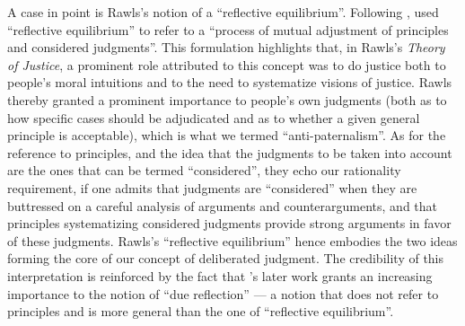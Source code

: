 \documentclass[version=3.21, pagesize, twoside=off, bibliography=totoc, DIV=calc, fontsize=12pt, a4paper, french, english]{scrartcl}
\begin{document}
A case in point is Rawls’s notion of a “reflective equilibrium”. 
Following \citet{goodman_fact_1983}, \citet[][p.18]{rawls_theory_1999} used “reflective equilibrium” to refer to a “process of mutual adjustment of principles and considered judgments”. 
This formulation highlights that, in Rawls's \emph{Theory of Justice}, a prominent role attributed to this concept was to do justice both to people's moral intuitions and to the need to systematize visions of justice. 
Rawls thereby granted a prominent importance to people's own judgments (both as to how specific cases should be adjudicated and as to whether a given general principle is acceptable), which is what we termed  “anti-paternalism”. 
As for the reference to principles, and the idea that the judgments to be taken into account are the ones that can be termed “considered”, they echo our rationality requirement, if one admits that judgments are  “considered” when they are buttressed on a careful analysis of arguments and counterarguments, and that principles systematizing considered judgments provide strong arguments in favor of these judgments. 
Rawls's “reflective equilibrium” hence embodies the two ideas forming the core of our concept of deliberated judgment. 
The credibility of this interpretation is reinforced by the fact that \citeauthor{rawls_political_2005}’s \citeyearpar{rawls_political_2005} later work grants an increasing importance to the notion of “due reflection” --- a notion that does not refer to principles and is more general than the one of “reflective equilibrium”. 

\end{document}

